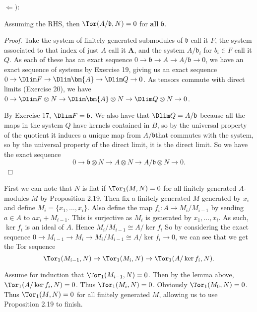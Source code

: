 \documentclass[a4paper]{exam}
\begin{document}
\begin{questions}
\begin{solution}
		$\Leftarrow) $:
		\begin{lem}
			Assuming the RHS, then $\Tor(A / \mathfrak{b},N) = 0 $ for \textbf{all} $\mathfrak{b} $.
		\end{lem}
		\begin{proof}
			Take the system of finitely generated submodules of $\mathfrak{b} $ call it $F $, the system associated to that index of just $A $ call it $\bm{A} $, and the system $A / \mathfrak{b}_i $ for $b_i \in F$ call it $Q $.
			As each of these has an exact sequence $0\to\mathfrak{b} \to A \to A / \mathfrak{b}\to 0$, we have an exact sequence of systems by Exercise 19, giving us an exact sequence $0\to \Dlim F \to \Dlim \bm{A} \to \Dlim Q \to 0$.
			As tensors commute with direct limits (Exercise 20), we have $0\to \Dlim F \otimes N \to \Dlim \bm{A} \otimes N \to \Dlim Q \otimes N \to 0 $.

			By Exercise 17, $\Dlim F = \mathfrak{b} $.
			We also have that $\Dlim Q = A / \mathfrak{b} $ because all the maps in the system $Q $ have kernels contained in $B $, so by the universal property of the quotient it induces a unique map from $A / \mathfrak{b} $that commutes with the system, so by the universal property of the direct limit, it is the direct limit.
			So we have the exact sequence
			\[
				0 \to \mathfrak{b} \otimes N \to A \otimes N \to A / \mathfrak{b} \otimes N\to 0
			.\]
		\end{proof}

		First we can note that $N $ is flat if $\Tor_1(M,N) = 0 $ for all finitely generated $A $-modules $M $ by Proposition 2.19.
		Then fix a finitely generated $M $ generated by $x_i $ and define $M_i = \{x_{1},\ldots, x_i\}   $.
		Also define the map $f_i: A \to M_i / M_{i-1} $ by sending $a \in A $ to $ax_i + M_{i-1} $.
		This is surjective as $M_i $ is generated by $x_{1}, \ldots , x_i $.
		As such, $\ker f_i $ is an ideal of $A $.
		Hence $M_i / M_{i-1} \cong A / \ker f_i$
		So by considering the exact sequence $0 \to M_{i-1} \to M_{i}\to M_i / M_{i-1} \cong A / \ker f_i \to 0$, we can see that we get the Tor sequence
		\[
			\Tor_1(M_{i-1},N) \to \Tor_1(M_i,N) \to \Tor_1(A / \ker f_i, N)
		.\]

		Assume for induction that $\Tor_1(M_{i-1},N) = 0 $.
		Then by the lemma above, $\Tor_1(A / \ker f_i,N) = 0 $.
		Thus $\Tor_{1}(M_i,N) = 0 $.
		Obviously $\Tor_{1}(M_{0},N) = 0 $.
		Thus $\Tor_{1}(M,N) = 0 $ for all finitely generated $M $, allowing us to use Proposition 2.19 to finish.
	\end{solution}


\end{questions}
\end{document}
